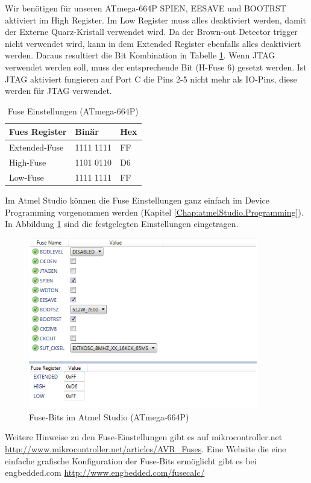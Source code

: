 Wir benötigen für unseren ATmega-664P SPIEN, EESAVE und BOOTRST aktiviert im
High Register. Im Low Register muss alles deaktiviert werden, damit der Externe
Quarz-Kristall verwendet wird. Da der Brown-out Detector trigger nicht
verwendet wird, kann in dem Extended Register ebenfalls alles deaktiviert
werden. Daraus resultiert die Bit Kombination in Tabelle \ref{fuses-result}.
Wenn \ac{JTAG} verwendet werden soll, muss der entsprechende Bit (H-Fuse 6)
gesetzt werden. Ist \ac{JTAG} aktiviert fungieren auf Port C die Pins 2-5
nicht mehr als IO-Pins, diese werden für \ac{JTAG} verwendet.

\begin{table}[H]
\centering
\begin{tabular}{|l|l|l|} \hline
Fues Register & Binär & Hex\\ \hline
Extended-Fuse & 1111 1111 & FF\\ \hline
High-Fuse & 1101 0110 & D6\\ \hline
Low-Fuse & 1111 1111 & FF\\ \hline
\end{tabular}
\caption{Fuse Einstellungen (ATmega-664P)}
\label{fuses-result}
\end{table}

Im Atmel Studio können die Fuse Einstellungen ganz einfach im Device Programming
vorgenommen werden (Kapitel \ref{Chap:atmelStudio.Programming}). In Abbildung
\ref{fuses-graf} sind die festgelegten Einstellungen eingetragen.

\begin{figure}[H]
\centering
\includegraphics[width=10cm]{content/pictures/Fusebits/fusebits_atmelstudio.png}
\caption{Fuse-Bits im Atmel Studio (ATmega-664P)}
\label{fuses-graf}
\end{figure}

Weitere Hinweise zu den Fuse-Einstellungen gibt es auf mikrocontroller.net
\url{http://www.mikrocontroller.net/articles/AVR_Fuses}.
Eine Website die eine einfache grafische Konfiguration der Fuse-Bits ermöglicht
gibt es bei engbedded.com \url{http://www.engbedded.com/fusecalc/}

